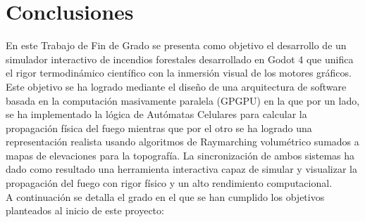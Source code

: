 \chapter{Conclusiones}
En este Trabajo de Fin de Grado se presenta como objetivo el desarrollo de un simulador interactivo de incendios forestales desarrollado en Godot 4 que unifica el rigor termodinámico científico con la inmersión visual de los motores gráficos. Este objetivo se ha logrado mediante el diseño de una arquitectura de software basada en la computación masivamente paralela (GPGPU) en la que por un lado, se ha implementado la lógica de Autómatas Celulares para calcular la propagación física del fuego mientras que por el otro se ha logrado una representación realista usando algoritmos de Raymarching volumétrico sumados a mapas de elevaciones para la topografía. La sincronización de ambos sistemas ha dado como resultado una herramienta interactiva capaz de simular y visualizar la propagación del fuego con rigor físico y un alto rendimiento computacional.\\

A continuación se detalla el grado en el que se han cumplido los objetivos planteados al inicio de este proyecto:

